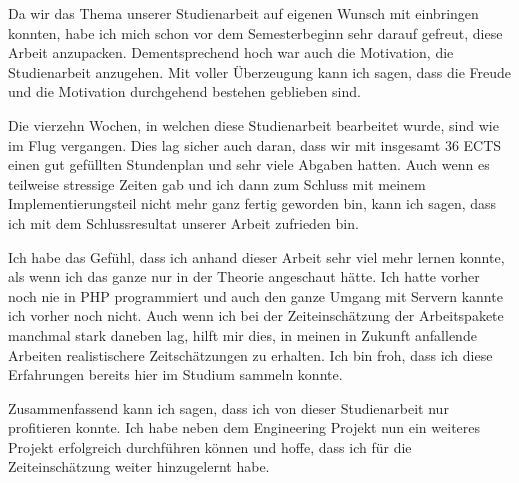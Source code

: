 
Da wir das Thema unserer Studienarbeit auf eigenen Wunsch mit einbringen konnten, habe ich mich schon vor dem Semesterbeginn sehr darauf gefreut, diese Arbeit anzupacken. Dementsprechend hoch war auch die Motivation, die Studienarbeit anzugehen. Mit voller Überzeugung kann ich sagen, dass die Freude und die Motivation durchgehend bestehen geblieben sind. 

\bigskip

Die vierzehn Wochen, in welchen diese Studienarbeit bearbeitet wurde, sind wie im Flug vergangen. Dies lag sicher auch daran, dass wir mit insgesamt 36 ECTS einen gut gefüllten Stundenplan und sehr viele Abgaben hatten.
Auch wenn es teilweise stressige Zeiten gab und ich dann zum Schluss mit meinem Implementierungsteil nicht mehr ganz fertig geworden bin, kann ich sagen, dass ich mit dem Schlussresultat unserer Arbeit zufrieden bin.

\bigskip

Ich habe das Gefühl, dass ich anhand dieser Arbeit sehr viel mehr lernen konnte, als wenn ich das ganze nur in der Theorie angeschaut hätte. Ich hatte vorher noch nie in PHP programmiert und auch den ganze Umgang mit Servern kannte ich vorher noch nicht. Auch wenn ich bei der Zeiteinschätzung der Arbeitspakete manchmal stark daneben lag, hilft mir dies, in meinen in Zukunft anfallende Arbeiten realistischere Zeitschätzungen zu erhalten. Ich bin froh, dass ich diese Erfahrungen bereits hier im Studium sammeln konnte.

\bigskip
Zusammenfassend kann ich sagen, dass ich von dieser Studienarbeit nur profitieren konnte. Ich habe neben dem Engineering Projekt nun ein weiteres Projekt erfolgreich durchführen können und hoffe, dass ich für die Zeiteinschätzung weiter hinzugelernt habe.
